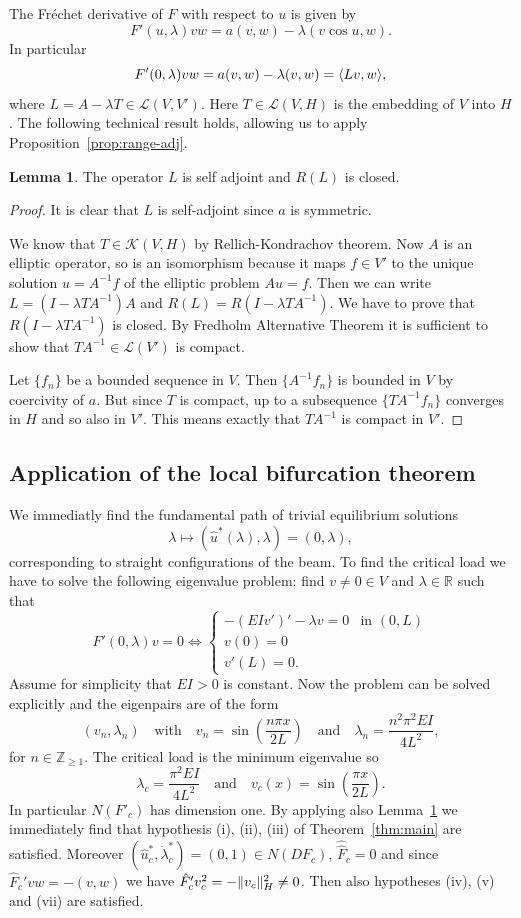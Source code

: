 \documentclass[a4paper,11pt]{article}
\theoremstyle{definition}
\newtheorem{lemma}[prop]{Lemma}
\DeclarePairedDelimiter{\norm}{\lVert}{\rVert}
\DeclarePairedDelimiter{\dual}{\langle}{\rangle}
\begin{document}
The Fréchet derivative of $F$ with respect to $u$ is given by
\[
F'(u,\lambda)vw=a(v,w)-\lambda(v\cos u,w).
\]
In particular
\[
F'(0,\lambda)vw=a(v,w)-\lambda(v,w)=\dual{Lv,w},
\]
where $L=A-\lambda T\in\mathscr{L}(V,V')$. Here $T\in\mathscr{L}(V,H)$ is the embedding of $V$ into $H$. The following technical result holds, allowing us to apply Proposition~\ref{prop:range-adj}.

\begin{lemma}
\label{lemma:euler}
The operator $L$ is self adjoint and $R(L)$ is closed.
\end{lemma}
\begin{proof}
It is clear that $L$ is self-adjoint since $a$ is symmetric.

We know that $T\in\mathscr{K}(V,H)$ by Rellich-Kondrachov theorem. Now $A$ is an elliptic operator, so is an isomorphism because it maps $f\in V'$ to the unique solution $u=A^{-1}f$ of the elliptic problem $Au=f$. Then we can write $L=(I-\lambda TA^{-1})A$ and $R(L)=R(I-\lambda TA^{-1})$. We have to prove that $R(I-\lambda TA^{-1})$ is closed. By Fredholm Alternative Theorem it is sufficient to show that $TA^{-1}\in\mathscr{L}(V')$ is compact.

Let $\{f_n\}$ be a bounded sequence in $V$. Then $\{A^{-1}f_n\}$ is bounded in $V$ by coercivity of $a$. But since $T$ is compact, up to a subsequence $\{TA^{-1}f_n\}$ converges in $H$ and so also in $V'$. This means exactly that $TA^{-1}$ is compact in $V'$.
\end{proof}

\subsection{Application of the local bifurcation theorem}

We immediatly find the fundamental path of trivial equilibrium solutions
\[
\lambda\mapsto(\hat u^*(\lambda),\lambda)=(0,\lambda),
\]
corresponding to straight configurations of the beam. To find the critical load we have to solve the following eigenvalue problem: find $v\neq0\in V$ and $\lambda\in\mathbb{R}$ such that
\[
F'(0,\lambda)v=0\iff
\begin{cases}
-(EIv')'-\lambda v=0 & \text{in $(0,L)$} \\
v(0)=0 \\
v'(L)=0.
\end{cases}
\]
Assume for simplicity that $EI>0$ is constant. Now the problem can be solved explicitly and the eigenpairs are of the form
\[
(v_n,\lambda_n)\quad\text{with}\quad v_n=\sin\left(\frac{n\pi x}{2L}\right)\quad\text{and}\quad\lambda_n=\frac{n^2\pi^2 EI}{4L^2},
\]
for $n\in\mathbb{Z}_{\ge1}$. The critical load is the minimum eigenvalue so
\[
\lambda_c=\frac{\pi^2 EI}{4L^2}\quad\text{and}\quad v_c(x)=\sin\left(\frac{\pi x}{2L}\right).
\]
In particular $N(F'_c)$ has dimension one. By applying also Lemma~\ref*{lemma:euler} we immediately find that hypothesis (i), (ii), (iii) of Theorem~\ref{thm:main} are satisfied. Moreover $(\hat{u}_c^*,\dot\lambda_c^*)=(0,1)\in N(DF_c)$, $\hat{\hat{F}}_c=0$ and since $\hat{F}_c'vw=-(v,w)$ we have $\hat{F}_c'v_c^2=-\norm{v_c}_H^2\neq0$. Then also hypotheses (iv), (v) and (vii) are satisfied.
\end{document}
